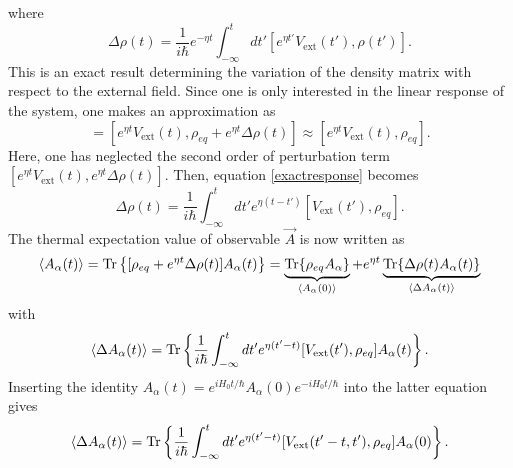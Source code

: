 \documentclass[a4paper,12pts,dvipsnames]{article}
\numberwithin{equation}{section}
\begin{document}
where
\begin{equation}
		\boxed{\Delta\rho(t) = \frac{1}{i\hbar}e^{-\eta t}\int^t_{-\infty}dt'[e^{\eta t'}V_{\text{ext}}(t'),\rho(t')].}\label{exactresponse}
\end{equation}
This is an exact result determining the variation of the density matrix with respect to the external field. Since one is only interested in the linear response of the system, one makes an approximation as
\begin{equation}
[e^{\eta t}V_{\text{ext}}(t),\rho(t)] = [e^{\eta t}V_{\text{ext}}(t),\rho_{eq}+e^{\eta t}\Delta\rho(t)] \approx [e^{\eta t}V_{\text{ext}}(t),\rho_{eq}].
\end{equation}
Here, one has neglected the second order of perturbation term $[e^{\eta t}V_{\text{ext}}(t),e^{\eta t}\Delta\rho(t)]$. Then, equation \ref{exactresponse} becomes
\begin{equation}
	\Delta\rho(t) = \frac{1}{i\hbar}\int^t_{-\infty}dt' e^{\eta(t-t')}[V_{\text{ext}}(t'),\rho_{eq}].
\end{equation}
The thermal expectation value of observable $\vec{A}$ is now written as
\begin{align}
\braket{A_{\alpha}(t)} = \text{Tr}\left\lbrace[\rho_{eq}+e^{\eta t}\Delta\rho(t)]A_{\alpha}(t)\right\rbrace = \underbrace{\text{Tr}\{\rho_{eq}A_{\alpha}\}}_{\braket{A_{\alpha}(0)}} + e^{\eta t}\underbrace{\text{Tr}\{\Delta\rho(t)A_{\alpha}(t)\}}_{\braket{\Delta A_{\alpha}(t)}}
\end{align}
with
\begin{align}
\braket{\Delta A_{\alpha}(t)} = \text{Tr}\left\lbrace\frac{1}{i\hbar}\int^t_{-\infty}dt' e^{\eta(t'-t)}[V_{\text{ext}}(t'),\rho_{eq}]A_{\alpha}(t)\right\rbrace .
\end{align}
Inserting the identity $A_{\alpha}(t) = e^{iH_0t/\hbar}A_{\alpha}(0)e^{-iH_0t/\hbar}$ into the latter equation gives
\begin{equation}
	\braket{\Delta A_{\alpha}(t)} = \text{Tr}\left\lbrace\frac{1}{i\hbar}\int^t_{-\infty}dt' e^{\eta(t'-t)}[V_{\text{ext}}(t'-t,t'),\rho_{eq}]A_{\alpha}(0)\right\rbrace .\label{response}
\end{equation}
\end{document}
